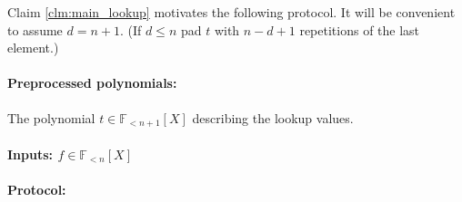 \documentclass[11pt]{article} %
\newcommand{\F}{\ensuremath{\mathbb F}\xspace}
\newcommand{\polysofdeg}[1]{\ensuremath{\F_{< #1}[X]}\xspace}
\begin{document}
 Claim \ref{clm:main_lookup} motivates the following protocol. 
It will be convenient to assume $d=n+1$. (If $d\leq n$ pad $t$ with $n-d+1$ repetitions of the last element.)
 \paragraph{Preprocessed polynomials:}
The polynomial $t \in \polysofdeg{n+1}$  describing the lookup values.


\paragraph{Inputs: $f\in \polysofdeg{n}$}
\paragraph{Protocol:}
\end{document}

